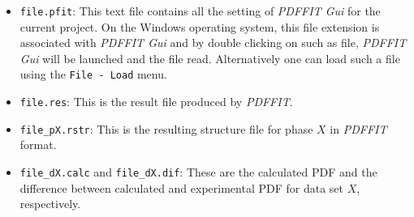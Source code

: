 \begin{itemize}
  \item {\tt file.pfit}: This text file contains all the setting of
  {\it PDFFIT Gui} for the current project. On the Windows
  operating system, this file extension is associated with {\it
  PDFFIT Gui} and by double clicking on such as file, {\it PDFFIT
  Gui} will be launched and the file read. Alternatively one can
  load such a file using the {\tt File - Load} menu.

  \item {\tt file.res}: This is the result file produced by {\it
  PDFFIT}.

  \item {\tt file\_pX.rstr}: This is the resulting structure file for
  phase $X$ in {\it PDFFIT} format.

  \item {\tt file\_dX.calc} and {\tt file\_dX.dif}: These are the
  calculated PDF and the difference between calculated and
  experimental PDF for data set $X$, respectively.
\end{itemize}


